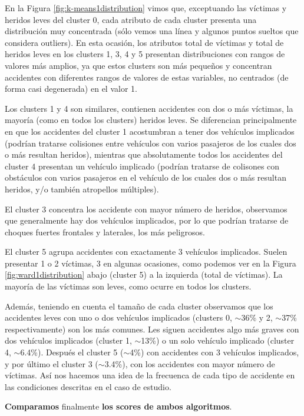 \documentclass[oneside]{book}
\begin{document}
En la Figura \ref{fig:k-means1distribution} vimos que, exceptuando las
víctimas y heridos leves del cluster 0, cada atributo de cada cluster
presenta una distribución muy concentrada (sólo vemos una línea y
algunos puntos sueltos que considera outliers). En esta ocasión, los
atributos total de víctimas y total de heridos leves en los clusters
1, 3, 4 y 5 presentan distribuciones con rangos de valores más
amplios, ya que estos clusters son más pequeños y concentran
accidentes con diferentes rangos de valores de estas variables, no
centrados (de forma casi degenerada) en el valor 1.

Los clusters 1 y 4 son similares, contienen accidentes con dos o más
víctimas, la mayoría (como en todos los clusters) heridos leves. Se
diferencian principalmente en que los accidentes del cluster 1
acostumbran a tener dos vehículos implicados (podrían tratarse
colisiones entre vehículos con varios pasajeros de los cuales dos o
más resultan heridos), mientras que absolutamente todos los accidentes
del cluster 4 presentan un vehículo implicado (podrían tratarse de
colisones con obstáculos con varios pasajeros en el vehículo de los
cuales dos o más resultan heridos, y/o también atropellos múltiples).

El cluster 3 concentra los accidente con mayor número de heridos,
observamos que generalmente hay dos vehículos implicados, por lo que
podrían tratarse de choques fuertes frontales y laterales, los más
peligrosos.

El cluster 5 agrupa accidentes con exactamente 3 vehículos
implicados. Suelen presentar 1 o 2 víctimas, 3 en algunas ocasiones,
como podemos ver en la Figura \ref{fig:ward1distribution} abajo
(cluster 5) a la izquierda (total de víctimas). La mayoría de las
víctimas son leves, como ocurre en todos los clusters.

Además, teniendo en cuenta el tamaño de cada cluster observamos que
los accidentes leves con uno o dos vehículos implicados (clusters 0,
$\sim$36\% y 2, $\sim$37\% respectivamente) son los más comunes. Les
siguen accidentes algo más graves con dos vehículos implicados
(cluster 1, $\sim$13\%) o un solo vehículo implicado (cluster 4,
$\sim$6.4\%). Después el cluster 5 ($\sim$4\%) con accidentes con 3
vehículos implicados, y por último el cluster 3 ($\sim$3.4\%), con los
accidentes con mayor número de víctimas. Así nos hacemos una idea de
la frecuenca de cada tipo de accidente en las condiciones descritas en
el caso de estudio.

\textbf{Comparamos} finalmente \textbf{los scores de ambos
  algoritmos}.
\end{document}
